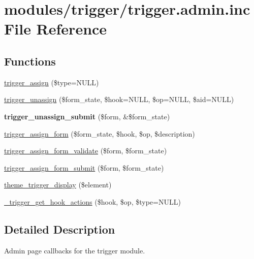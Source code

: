 \hypertarget{trigger_8admin_8inc}{
\section{modules/trigger/trigger.admin.inc File Reference}
\label{trigger_8admin_8inc}
}
\subsection*{Functions}
\begin{CompactItemize}
\item 
\hyperlink{trigger_8admin_8inc_85741ccca04cdb6fabb8c6c644902013}{trigger\_\-assign} (\$type=NULL)
\item 
\hyperlink{group__forms_gc2c2d1e7054da26671a18e1a6d1e4631}{trigger\_\-unassign} (\$form\_\-state, \$hook=NULL, \$op=NULL, \$aid=NULL)
\item 
\hypertarget{trigger_8admin_8inc_e0e1a6cb2c032a6650a19c8d898896c0}{
\textbf{trigger\_\-unassign\_\-submit} (\$form, \&\$form\_\-state)}
\label{trigger_8admin_8inc_e0e1a6cb2c032a6650a19c8d898896c0}

\item 
\hyperlink{trigger_8admin_8inc_cf100bfaaa96b66189c785d7a7d54dae}{trigger\_\-assign\_\-form} (\$form\_\-state, \$hook, \$op, \$description)
\item 
\hyperlink{trigger_8admin_8inc_b8f232934437a99af0903a397c090934}{trigger\_\-assign\_\-form\_\-validate} (\$form, \$form\_\-state)
\item 
\hyperlink{trigger_8admin_8inc_53539d67f577fc171251efbd969d5d67}{trigger\_\-assign\_\-form\_\-submit} (\$form, \$form\_\-state)
\item 
\hyperlink{group__themeable_g291ceb7284cc7baf7dcf551a9cedec24}{theme\_\-trigger\_\-display} (\$element)
\item 
\hyperlink{trigger_8admin_8inc_918f527b019873c09fa8eab68415a355}{\_\-trigger\_\-get\_\-hook\_\-actions} (\$hook, \$op, \$type=NULL)
\end{CompactItemize}


\subsection{Detailed Description}
Admin page callbacks for the trigger module. 

